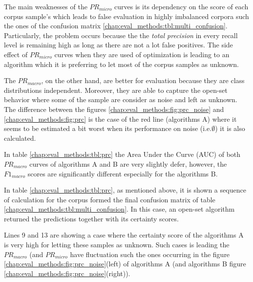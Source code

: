 The main weaknesses of the $PR_{micro}$ curves is its dependency on the score of each corpus sample's which leads to false evaluation in highly imbalanced corpora such the ones of the confusion matrix \ref{chap:eval_methods:tbl:multi_confusion}. Particularly, the problem occurs because the the \textit{total precision} in every recall level is remaining high as long as there are not a lot false positives. The side effect of $PR_{micro}$ curves when they are used of optimization is leading to an algorithm which it is preferring to let most of the corpus samples as unknown.

The $PR_{macro}$, on the other hand, are better for evaluation because they are class distributions independent. Moreover, they are able to capture the open-set behavior where some of the sample are consider as noise and left as unknown. The difference between the figures \ref{chap:eval_methods:fig:prc_noise} and \ref{chap:eval_methods:fig:prc} is the case of the red line (algorithms A) where it seems to be estimated a bit worst when its performance on noise (i.e.$\emptyset$) it is also calculated.

In table \ref{chap:eval_methods:tbl:prc} the Area Under the Curve (AUC) of both $PR_{macro}$ curves of algorithms A and B are very slightly defer, however, the $F1_{macro}$ scores are significantly different especially for the algorithms B.

In table \ref{chap:eval_methods:tbl:prc}, as mentioned above, it is shown a sequence of calculation for the corpus formed the final confusion matrix of table \ref{chap:eval_methods:tbl:multi_confusion}. In this case, an open-set algorithm returned the predictions together with its certainty scores. 

Lines 9 and 13 are showing a case where the certainty score of the algorithms A is very high for letting these samples as unknown. Such cases is leading the $PR_{macro}$  (and $PR_{micro}$ have fluctuation such the ones occurring in the figure \ref{chap:eval_methods:fig:prc_noise}(left) of algorithms A (and algorithms B figure \ref{chap:eval_methods:fig:prc_noise}(right)).



